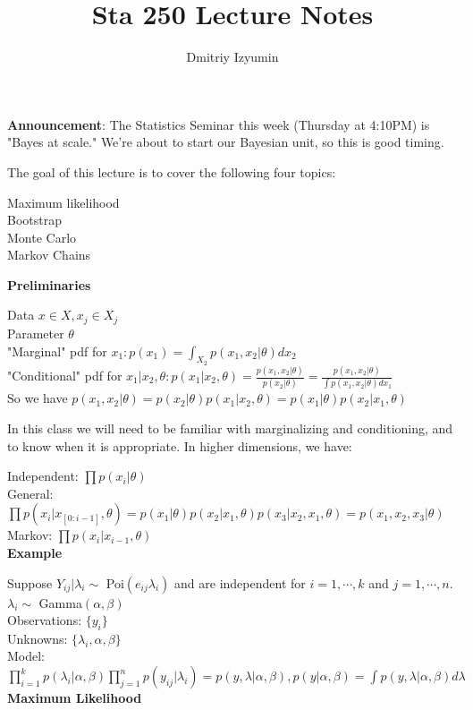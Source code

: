 \documentclass[12pt]{article}
\begin{document}
 
\title{Sta 250 Lecture Notes}
\author{Dmitriy Izyumin}
\maketitle

\textbf{Announcement}: The Statistics Seminar this week (Thursday at 4:10PM) is "Bayes at scale." We're about to start our Bayesian unit, so this is good timing.

The goal of this lecture is to cover the following four topics:

Maximum likelihood\\
Bootstrap\\
Monte Carlo\\
Markov Chains

\textbf{Preliminaries}

Data $x \in X, x_j \in X_j$\\
Parameter $\theta$\\
"Marginal" pdf for $x_1: p(x_1)=\int_{X_2}p(x_1,x_2|\theta)dx_2$\\
"Conditional" pdf for $x_1|x_2,\theta: p(x_1|x_2,\theta)=\frac{p(x_1,x_2|\theta)}{p(x_2|\theta)}=\frac{p(x_1,x_2|\theta)}{\int p(x_1,x_2|\theta)dx_1}$\\
So we have $p(x_1,x_2|\theta)=p(x_2|\theta)p(x_1|x_2,\theta)=p(x_1|\theta)p(x_2|x_1,\theta)$

In this class we will need to be familiar with marginalizing and conditioning, and to know when it is appropriate. In higher dimensions, we have:

Independent: $\prod p(x_i|\theta)$\\
General: $\prod p(x_i|x_{[0:i-1]},\theta)=p(x_1|\theta)p(x_2|x_1,\theta)p(x_3|x_2,x_1,\theta)=p(x_1,x_2,x_3|\theta)$\\
Markov: $\prod p(x_i|x_{i-1},\theta)$\\

\textbf{Example}

Suppose $Y_{ij}|\lambda_i \sim$ Poi$(e_{ij}\lambda_i)$ and are independent for $i=1,\cdots, k$ and $j=1,\cdots,n$.\\
$\lambda_i \sim$ Gamma$(\alpha,\beta)$\\
Observations: $\{y_i\}$\\
Unknowns: $\{\lambda_i, \alpha,\beta\}$\\
Model: $\prod_{i=1}^k p(\lambda_i|\alpha,\beta) \prod_{j=1}^n p(y_{ij}|\lambda_i)=p(y,\lambda|\alpha,\beta), p(y|\alpha,\beta)=\int p(y,\lambda|\alpha,\beta)d\lambda$
\newpage
\textbf{Maximum Likelihood}
\end{document}
